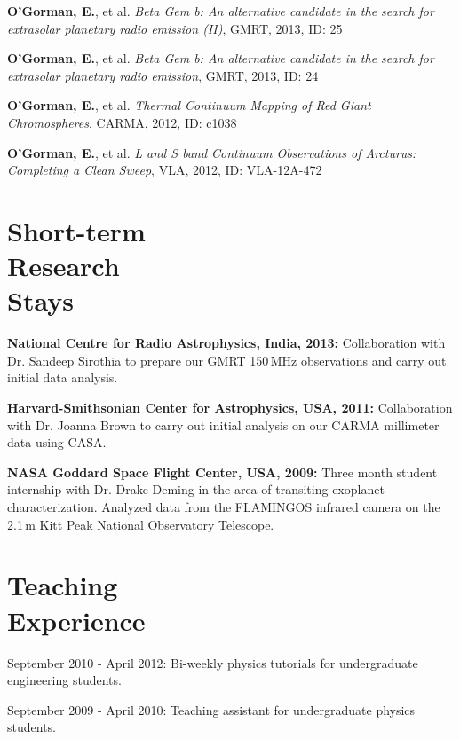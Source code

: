 \documentclass[margin,line]{resume}
\begin{document}
\begin{resume}
\textbf{O'Gorman, E.}, et al. \textit{Beta Gem b: An alternative candidate in the search for extrasolar planetary radio emission (II)}, GMRT, 2013, ID: 25%

\textbf{O'Gorman, E.}, et al. \textit{Beta Gem b: An alternative candidate in the search for extrasolar planetary radio emission}, GMRT, 2013, ID: 24%

\textbf{O'Gorman, E.}, et al. \textit{Thermal Continuum Mapping of Red Giant Chromospheres}, CARMA, 2012, ID: c1038%

\textbf{O'Gorman, E.}, et al. \textit{L and S band Continuum Observations of Arcturus: Completing a Clean Sweep}, VLA, 2012, ID: VLA-12A-472%

    \vspace{2mm}
    \section{\mysidestyle Short-term\\Research\\Stays}

\textbf{National Centre for Radio Astrophysics, India, 2013:} Collaboration with Dr. Sandeep Sirothia to prepare our GMRT 150\,MHz observations and carry out initial data analysis.

\textbf{Harvard-Smithsonian Center for Astrophysics, USA, 2011:} Collaboration with Dr. Joanna Brown to carry out initial analysis on our CARMA millimeter data using CASA. 

\textbf{NASA Goddard Space Flight Center, USA, 2009:} Three month student internship with Dr. Drake Deming in the area of transiting exoplanet characterization. Analyzed data from the FLAMINGOS infrared camera on the 2.1\,m Kitt Peak National Observatory Telescope.

    \vspace{2mm}
    \section{\mysidestyle Teaching\\Experience}

	\begin{list2}
    \item September 2010 - April 2012: Bi-weekly physics tutorials for undergraduate engineering students.
    \item September 2009 - April 2010: Teaching assistant for undergraduate physics students. \vspace{-1mm}\\%
    \end{list2}


\end{resume}
\end{document}
